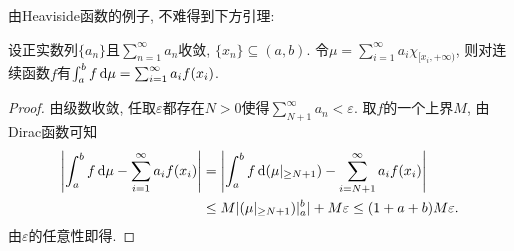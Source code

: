 由Heaviside函数的例子, 不难得到下方引理: 

\begin{lemma}{}
	设正实数列$\{ a_n \}$且$\sum_{n=1}^{\infty} a_n$收敛, $\{ x_n \}\subseteq (a,b)$. 令$\mu = \sum_{i=1}^{\infty} a_i\chi _{[x_i,+\infty)}$, 则对连续函数$f$有$\int_a^b f \mathop{}\!\mathrm{d} \mu = \sum_{i=1}^{\infty} a_if(x_i)$. 
\end{lemma}
\begin{proof}
	由级数收敛, 任取$\varepsilon$都存在$N>0$使得$\sum_{N+1}^{\infty} a_n <\varepsilon$. 取$f$的一个上界$M$, 由Dirac函数可知
	\begin{align*}
		\left| \int_a^b f \mathop{}\!\mathrm{d} \mu - \sum_{i=1}^{\infty} a_if(x_i) \right| &= \left| \int_a^b f \mathop{}\!\mathrm{d} (\mu|_{\geq N+1}) - \sum_{i=N+1}^{\infty} a_if(x_i) \right| \\
		&\leq M|(\mu|_{\geq N+1})|_a^b| + M\varepsilon \leq (1+a+b)M\varepsilon .
	\end{align*}
	由$\varepsilon$的任意性即得. 
\end{proof}
























